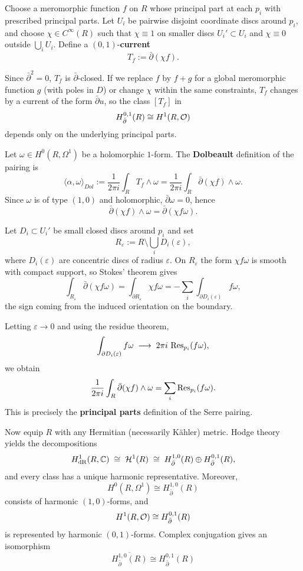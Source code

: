 \documentclass[12pt]{article}
\begin{document}
\begin{solution} Choose a meromorphic function $f$ on $R$ whose principal part at each
$p_i$ with prescribed principal parts. Let $U_i$ be pairwise disjoint coordinate discs around $p_i$, and choose
$\chi\in C^\infty(R)$ such that $\chi\equiv 1$ on smaller discs $U_i'\subset U_i$
and $\chi\equiv 0$ outside $\bigcup_i U_i$.
Define a $(0,1)$-\textbf{current}
\[
T_f := \bar\partial(\chi f).
\]

Since $\bar\partial^2=0$, $T_f$ is $\bar\partial$-closed.
If we replace $f$ by $f+g$ for a global meromorphic function $g$
(with poles in $D$) or change $\chi$ within the same constraints,
$T_f$ changes by a current of the form $\bar\partial u$, so the
class $[T_f]$ in
\[
H^{0,1}_{\bar\partial}(R) \cong H^1(R,{\mathcal{O}})
\]
depends only on the underlying principal parts.

Let $\omega\in H^0(R,\Omega^1)$ be a holomorphic $1$-form.
The \textbf{Dolbeault} definition of the pairing is
\[
\langle\alpha,\omega\rangle_{Dol}
:= \frac{1}{2\pi i}\int_R T_f\wedge\omega
= \frac{1}{2\pi i}\int_R \bar\partial(\chi f)\wedge\omega.
\]
Since $\omega$ is of type $(1,0)$ and holomorphic,
$\bar\partial\omega=0$, hence
\[
\bar\partial(\chi f)\wedge\omega
= \bar\partial(\chi f\omega).
\]

Let $D_i\subset U_i'$ be small closed discs around $p_i$ and set
\[
R_\varepsilon := R\setminus\bigcup_i D_i(\varepsilon),
\]
where $D_i(\varepsilon)$ are concentric discs of radius $\varepsilon$.
On $R_\varepsilon$ the form $\chi f\omega$ is smooth with compact
support, so Stokes' theorem gives
\[
\int_{R_\varepsilon} \bar\partial(\chi f\omega)
= \int_{\partial R_\varepsilon} \chi f\omega
= -\sum_i \int_{\partial D_i(\varepsilon)} f\omega,
\]
the sign coming from the induced orientation on the boundary.

Letting $\varepsilon\to 0$ and using the residue theorem,
\[
\int_{\partial D_i(\varepsilon)} f\omega
\;\longrightarrow\; 2\pi i\,\operatorname{Res}_{p_i}(f\omega),
\]
we obtain
\[
\frac{1}{2\pi i}\int_R \bar\partial(\chi f)\wedge\omega
= \sum_i \operatorname{Res}_{p_i}(f\omega).
\]
This is precisely the \textbf{principal parts} definition of the Serre pairing.

Now equip $R$ with any Hermitian (necessarily K\"ahler) metric. Hodge theory yields the decompositions
\[
H^1_{\operatorname{dR}}(R,\mathbb{C})
\;\cong\;
{\mathcal{H}}^1(R) \;\cong\;
H^{1,0}_{\bar\partial}(R)\oplus H^{0,1}_{\bar\partial}(R),
\]
and every class has a unique harmonic representative.  Moreover,
\[
H^0(R,\Omega^1) \cong H^{1,0}_{\bar\partial}(R)
\]
consists of harmonic $(1,0)$-forms, and
\[
H^1(R,{\mathcal{O}}) \cong H^{0,1}_{\bar\partial}(R)
\]
is represented by harmonic $(0,1)$-forms.  Complex conjugation gives
an isomorphism \[\overline{H^{1,0}_{\bar\partial}(R)}
\cong H^{0,1}_{\bar\partial}(R)\]


\end{solution}
\end{document}
